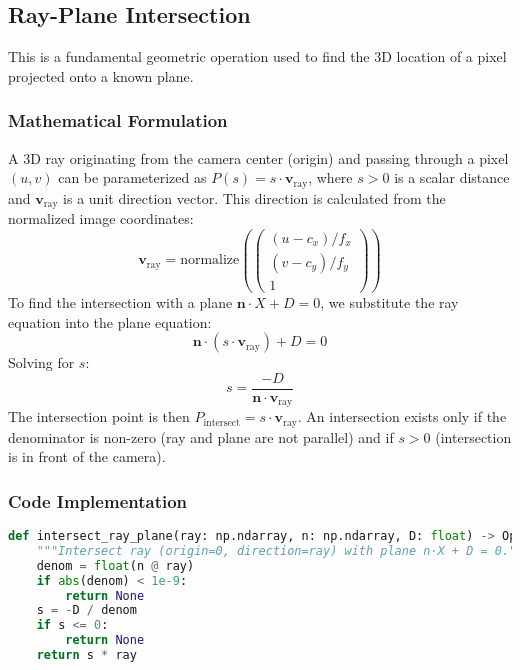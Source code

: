 \documentclass{article}
\begin{document}
\subsection{Ray-Plane Intersection}
This is a fundamental geometric operation used to find the 3D location of a pixel projected onto a known plane.

\subsubsection{Mathematical Formulation}
A 3D ray originating from the camera center (origin) and passing through a pixel $(u,v)$ can be parameterized as $P(s) = s \cdot \mathbf{v}_{\text{ray}}$, where $s > 0$ is a scalar distance and $\mathbf{v}_{\text{ray}}$ is a unit direction vector. This direction is calculated from the normalized image coordinates:
\begin{equation}
\mathbf{v}_{\text{ray}} = \text{normalize}\left( \begin{pmatrix} (u - c_x) / f_x \\ (v - c_y) / f_y \\ 1 \end{pmatrix} \right)
\end{equation}
To find the intersection with a plane $\mathbf{n} \cdot X + D = 0$, we substitute the ray equation into the plane equation:
\begin{equation}
\mathbf{n} \cdot (s \cdot \mathbf{v}_{\text{ray}}) + D = 0
\end{equation}
Solving for $s$:
\begin{equation}
s = \frac{-D}{\mathbf{n} \cdot \mathbf{v}_{\text{ray}}}
\end{equation}
The intersection point is then $P_{\text{intersect}} = s \cdot \mathbf{v}_{\text{ray}}$. An intersection exists only if the denominator is non-zero (ray and plane are not parallel) and if $s > 0$ (intersection is in front of the camera).

\subsubsection{Code Implementation}
\begin{lstlisting}[language=Python]
def intersect_ray_plane(ray: np.ndarray, n: np.ndarray, D: float) -> Optional[np.ndarray]:
    """Intersect ray (origin=0, direction=ray) with plane n·X + D = 0."""
    denom = float(n @ ray)
    if abs(denom) < 1e-9:
        return None
    s = -D / denom
    if s <= 0:
        return None
    return s * ray
\end{lstlisting}
\end{document}
